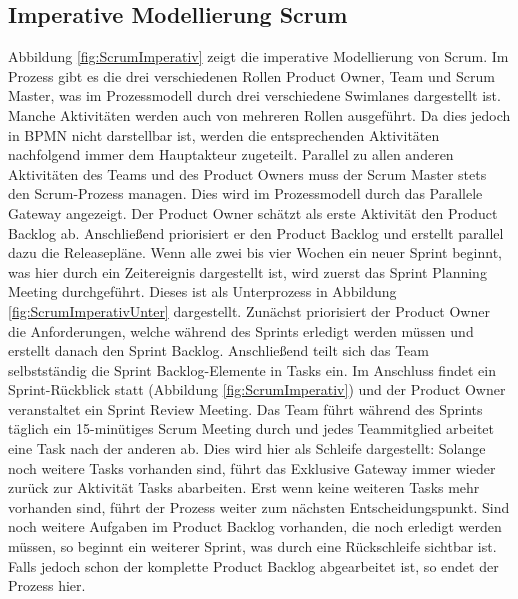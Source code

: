 \subsection{Imperative Modellierung Scrum}

Abbildung \ref{fig:ScrumImperativ} zeigt die imperative Modellierung von Scrum. Im Prozess gibt es die drei verschiedenen Rollen Product Owner, Team und Scrum Master, was im Prozessmodell durch drei verschiedene Swimlanes dargestellt ist. Manche Aktivitäten werden auch von mehreren Rollen ausgeführt. Da dies jedoch in BPMN nicht darstellbar ist, werden die entsprechenden Aktivitäten nachfolgend immer dem Hauptakteur zugeteilt.\newline
Parallel zu allen anderen Aktivitäten des Teams und des Product Owners muss der Scrum Master stets den Scrum-Prozess managen. Dies wird im Prozessmodell durch das Parallele Gateway angezeigt. \newline
Der Product Owner schätzt als erste Aktivität den Product Backlog ab. Anschließend priorisiert er den Product Backlog und erstellt parallel dazu die Releasepläne. \newline
Wenn alle zwei bis vier Wochen ein neuer Sprint beginnt, was hier durch ein Zeitereignis dargestellt ist, wird zuerst das Sprint Planning Meeting durchgeführt. Dieses ist als Unterprozess in Abbildung \ref{fig:ScrumImperativUnter} dargestellt. Zunächst priorisiert der Product Owner die Anforderungen, welche während des Sprints erledigt werden müssen und erstellt danach den Sprint Backlog. Anschließend teilt sich das Team selbstständig die Sprint Backlog-Elemente in Tasks ein.\newline
Im Anschluss findet ein Sprint-Rückblick statt (Abbildung \ref{fig:ScrumImperativ}) und der Product Owner veranstaltet ein Sprint Review Meeting.\newline
Das Team führt während des Sprints täglich ein 15-minütiges Scrum Meeting durch und jedes Teammitglied arbeitet eine Task nach der anderen ab. Dies wird hier als Schleife dargestellt: Solange noch weitere Tasks vorhanden sind, führt das Exklusive Gateway immer wieder zurück zur Aktivität  \grqq Tasks abarbeiten\grqq. Erst wenn keine weiteren Tasks mehr vorhanden sind, führt der Prozess weiter zum nächsten Entscheidungspunkt.\newline
Sind noch weitere Aufgaben im Product Backlog vorhanden, die noch erledigt werden müssen, so beginnt ein weiterer Sprint, was durch eine Rückschleife sichtbar ist. Falls jedoch schon der komplette Product Backlog abgearbeitet ist, so endet der Prozess hier.


